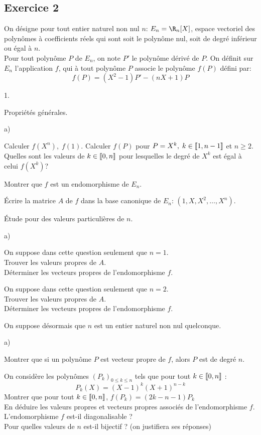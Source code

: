 \documentclass[11pt]{article}%
\begin{document}
\subsection*{Exercice 2} %
\noindent
On désigne pour tout entier naturel non nul $n$: $E_n=\R_n[X]$, espace
vectoriel des polynômes à coefficients réels qui sont soit le 
polynôme nul, soit de degré inférieur ou égal à $n$.\\
Pour tout polynôme $P$ de $E_n$, on note $P'$ le polynôme dérivé 
de $P$. On définit sur $E_n$ l'application $f$, qui à tout 
polynôme $P$ associe le polynôme $f(P)$ défini par:
\[
f(P)=(X^2-1)P'-(nX +1)P
\]
\begin{noliste}{1.}
\item Propriétés générales.
\begin{noliste}{a)}
\item Calculer $f(X^n),\; f(1)$. Calculer $f(P)$ pour $P = X^k,\; k\in
\llbracket 1,n-1 \rrbracket$ et $n\geq 2$.\\
Quelles sont les valeurs de $k\in\llbracket 0,n\rrbracket$ pour lesquelles le 
degré de $X^k$ est égal à celui $f(X^k)$?

\item Montrer que $f$ est un endomorphisme de $E_n$.

\item Écrire la matrice $A$ de $f$ dans la base canonique de $E_n$: 
$(1,X,X^2,\dots, X^n)$.
\end{noliste}

\item Étude pour des valeurs particulières de $n$.
\begin{noliste}{a)}
\item On suppose dans cette question seulement que $n=1$.\\
Trouver les valeurs propres de $A$.\\
Déterminer les vecteurs propres de l'endomorphisme $f$.

\item On suppose dans cette question seulement que $n=2$.\\
Trouver les valeurs propres de $A$.\\
Déterminer les vecteurs propres de l'endomorphisme $f$.
\end{noliste}

\item On suppose désormais que $n$ est un entier naturel non nul 
quelconque.
\begin{noliste}{a)}
\item Montrer que si un polynôme $P$ est vecteur propre de 
 $f$, alors $P$ est de degré $n$.

\item On considère les polynômes $(P_k)_{0\leq k\leq n}$ tels que 
pour tout $k\in\llbracket 0,n \rrbracket$ :
\[
P_k(X)=(X-1)^k(X+1)^{n-k}
\]
Montrer que pour tout $k\in\llbracket 0,n\rrbracket$, $f(P_k)=(2k-n-1)P_k$\\
En déduire les valeurs propres et vecteurs propres associés de 
l'endomorphisme $f$.\\
L'endomorphisme $f$ est-il diagonalisable ?\\
Pour quelles valeurs de $n$ est-il bijectif ? (on justifiera ses 
réponses)
\end{noliste}
\end{noliste}
\end{document}
